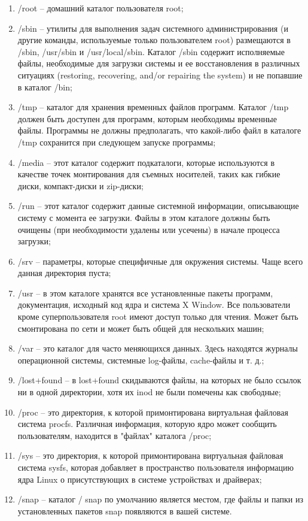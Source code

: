 \begin{enumerate}
    \item /root -- домашний каталог пользователя root;
    \item /sbin -- утилиты для выполнения задач системного администрирования (и другие команды, используемые только пользователем root) размещаются в /sbin, /usr/sbin и /usr/local/sbin. Каталог /sbin содержит исполняемые файлы, необходимые для загрузки системы и ее восстановления в различных ситуациях (restoring, recovering, and/or repairing the system) и не попавшие в каталог /bin;
    \item /tmp -- каталог для хранения временных файлов программ. Каталог /tmp должен быть доступен для программ, которым необходимы временные файлы. Программы не должны предполагать, что какой-либо файл в каталоге /tmp сохранится при следующем запуске программы;
    \item /media -- этот каталог содержит подкаталоги, которые используются в качестве точек монтирования для съемных носителей, таких как гибкие диски, компакт-диски и zip-диски;
    \item /run -- этот каталог содержит данные системной информации, описывающие систему с момента ее загрузки. Файлы в этом каталоге должны быть очищены (при необходимости удалены или усечены) в начале процесса загрузки;
    \item /srv -- параметры, которые специфичные для окружения системы. Чаще всего данная директория пуста;
    \item /usr -- в этом каталоге хранятся все установленные пакеты программ, документация, исходный код ядра и система X Window. Все пользователи кроме суперпользователя root имеют доступ только для чтения. Может быть смонтирована по сети и может быть общей для нескольких машин;
    \item /var -- это каталог для часто меняющихся данных. Здесь находятся журналы операционной системы, системные log-файлы, cache-файлы и т. д.;
    \item /lost+found -- в lost+found скидываются файлы, на которых не было ссылок ни в одной директории, хотя их inod не были помечены как свободные;
    \item /proc -- это директория, к которой примонтирована виртуальная файловая система procfs. Различная информация, которую ядро может сообщить пользователям, находится в "файлах" каталога /proc;
    \item /sys -- это директория, к которой примонтирована виртуальная файловая система sysfs, которая добавляет в пространство пользователя информацию ядра Linux о присутствующих в системе устройствах и драйверах;
    \item /snap -- каталог / snap по умолчанию является местом, где файлы и папки из установленных пакетов snap появляются в вашей системе.
\end{enumerate}

